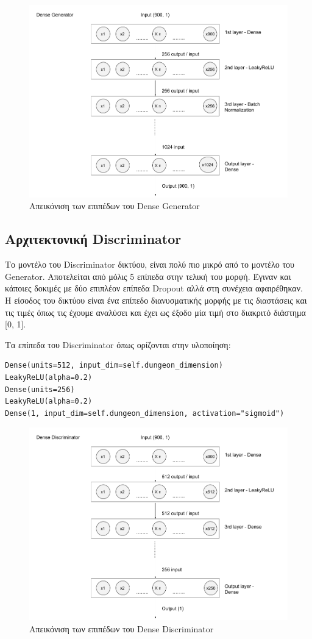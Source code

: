\begin{figure}[H]
\centering
\includegraphics[width=.8\linewidth]{../images/graphs/Dense_generator.png}
\caption{Απεικόνιση των επιπέδων του Dense Generator}
\label{fig:fig}
\end{figure}


\subsection{Αρχιτεκτονική Discriminator}
Το μοντέλο του Discriminator δικτύου, είναι πολύ πιο μικρό από το μοντέλο του Generator. Αποτελείται από μόλις 5 επίπεδα στην τελική του μορφή. Έγιναν και κάποιες δοκιμές με δύο επιπλέον επίπεδα Dropout αλλά στη συνέχεια αφαιρέθηκαν. Η είσοδος του δικτύου είναι ένα επίπεδο διανυσματικής μορφής με τις διαστάσεις και τις τιμές όπως τις έχουμε αναλύσει και έχει ως έξοδο μία τιμή στο διακριτό διάστημα [0, 1].
\par
Τα επίπεδα του Discriminator όπως ορίζονται στην υλοποίηση:
\begin{verbatim}
Dense(units=512, input_dim=self.dungeon_dimension)
LeakyReLU(alpha=0.2)
Dense(units=256)
LeakyReLU(alpha=0.2)
Dense(1, input_dim=self.dungeon_dimension, activation="sigmoid")
\end{verbatim}

\begin{figure}[H]
\centering
\includegraphics[width=.8\linewidth]{../images/graphs/Dense_discriminator.png}
\caption{Απεικόνιση των επιπέδων του Dense Discriminator}
\label{fig:fig}
\end{figure}

